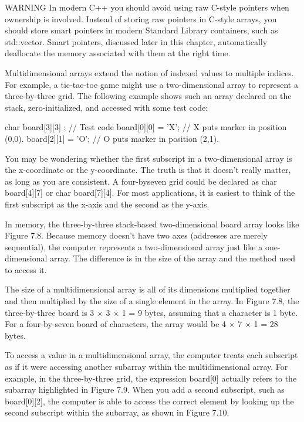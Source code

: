 \begin{myWarning}{WARNING}
In modern C++ you should avoid using raw C-style pointers when ownership is involved. Instead of storing raw pointers in C-style arrays, you should store smart pointers in modern Standard Library containers, such as std::vector. Smart pointers, discussed later in this chapter, automatically deallocate the memory associated with them at the right time.
\end{myWarning}


Multidimensional arrays extend the notion of indexed values to multiple indices. For example, a tic-tac-toe game might use a two-dimensional array to represent a three-by-three grid. The following example shows such an array declared on the stack, zero-initialized, and accessed with some test code:

\begin{cpp}
char board[3][3] {};
// Test code
board[0][0] = 'X'; // X puts marker in position (0,0).
board[2][1] = 'O'; // O puts marker in position (2,1).
\end{cpp}

You may be wondering whether the first subscript in a two-dimensional array is the x-coordinate or the y-coordinate. The truth is that it doesn’t really matter, as long as you are consistent. A four-byseven grid could be declared as char board[4][7] or char board[7][4]. For most applications, it is easiest to think of the first subscript as the x-axis and the second as the y-axis.


In memory, the three-by-three stack-based two-dimensional board array looks like Figure 7.8. Because memory doesn’t have two axes (addresses are merely sequential), the computer represents a two-dimensional array just like a one-dimensional array. The difference is in the size of the array and the method used to access it.


The size of a multidimensional array is all of its dimensions multiplied together and then multiplied by the size of a single element in the array. In Figure 7.8, the three-by-three board is 3 × 3 × 1 = 9 bytes, assuming that a character is 1 byte. For a four-by-seven board of characters, the array would be 4 × 7 × 1 = 28 bytes.

To access a value in a multidimensional array, the computer treats each subscript as if it were accessing another subarray within the multidimensional array. For example, in the three-by-three grid, the expression board[0] actually refers to the subarray highlighted in Figure 7.9. When you add a second subscript, such as board[0][2], the computer is able to access the correct element by looking up the second subscript within the subarray, as shown in Figure 7.10.

